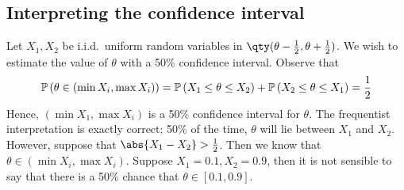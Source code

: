 \subsection{Interpreting the confidence interval}
\begin{example}
	Let $X_1, X_2$ be i.i.d.\ uniform random variables in $\qty(\theta - \frac{1}{2}, \theta + \frac{1}{2})$.
	We wish to estimate the value of $\theta$ with a 50\% confidence interval.
	Observe that
	\begin{align*}
		\mathbb{P}\left({\theta \in (\min X_i, \max X_i)}\right) = \mathbb{P}\left({X_1 \leq \theta \leq X_2}\right) + \mathbb{P}\left({X_2 \leq \theta \leq X_1}\right) = \frac{1}{2}
	\end{align*}
	Hence, $(\min X_1, \max X_i)$ is a 50\% confidence interval for $\theta$.
	The frequentist interpretation is exactly correct; 50\% of the time, $\theta$ will lie between $X_1$ and $X_2$.
	However, suppose that $\abs{X_1 - X_2} > \frac{1}{2}$.
	Then we know that $\theta \in (\min X_i, \max X_i)$.
	Suppose $X_1 = 0.1, X_2 = 0.9$, then it is not sensible to say that there is a 50\% chance that $\theta \in [0.1, 0.9]$.
\end{example}
